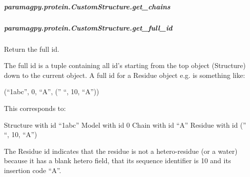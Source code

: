 \documentclass[a4paper,10pt,english,openany,oneside]{sphinxmanual}
\begin{document}
\begin{fulllineitems}
\begin{fulllineitems}
\begin{fulllineitems}
\label{\detokenize{reference/generated/paramagpy.protein.CustomStructure.get_atoms:paramagpy.protein.CustomStructure.get_atoms}}
\end{fulllineitems}



\subparagraph{paramagpy.protein.CustomStructure.get\_chains}
\label{\detokenize{reference/generated/paramagpy.protein.CustomStructure.get_chains:paramagpy-protein-customstructure-get-chains}}\label{\detokenize{reference/generated/paramagpy.protein.CustomStructure.get_chains::doc}}

\begin{fulllineitems}
\label{\detokenize{reference/generated/paramagpy.protein.CustomStructure.get_chains:paramagpy.protein.CustomStructure.get_chains}}
\end{fulllineitems}



\subparagraph{paramagpy.protein.CustomStructure.get\_full\_id}
\label{\detokenize{reference/generated/paramagpy.protein.CustomStructure.get_full_id:paramagpy-protein-customstructure-get-full-id}}\label{\detokenize{reference/generated/paramagpy.protein.CustomStructure.get_full_id::doc}}

\begin{fulllineitems}
\label{\detokenize{reference/generated/paramagpy.protein.CustomStructure.get_full_id:paramagpy.protein.CustomStructure.get_full_id}}
Return the full id.

The full id is a tuple containing all id’s starting from
the top object (Structure) down to the current object. A full id for
a Residue object e.g. is something like:

(“1abc”, 0, “A”, (” “, 10, “A”))

This corresponds to:

Structure with id “1abc”
Model with id 0
Chain with id “A”
Residue with id (” “, 10, “A”)

The Residue id indicates that the residue is not a hetero-residue
(or a water) because it has a blank hetero field, that its sequence
identifier is 10 and its insertion code “A”.


\end{fulllineitems}
\end{fulllineitems}
\end{fulllineitems}
\end{document}
